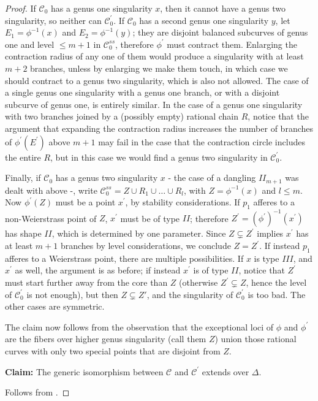 \documentclass[11pt]{amsart}
\newcommand{\dvr}{\Delta}
\theoremstyle{plain}
\theoremstyle{definition}
\begin{document}
\begin{proof}
 If $\mathcal C_0$ has a genus one singularity $x$, then it cannot have a genus two singularity, so neither can $\mathcal C^\prime_0$. If $\mathcal C_0$ has a second genus one singularity $y$, let $E_1=\phi^{-1}(x)$ and $E_2=\phi^{-1}(y)$; they are disjoint balanced subcurves of genus one and level $\leq m+1$ in $\mathcal C^{ss}_0$, therefore $\phi^\prime$ must contract them. Enlarging the contraction radius of any one of them would produce a singularity with at least $m+2$ branches, unless by enlarging we make them touch, in which case we should contract to a genus two singularity, which is also not allowed. The case of a single genus one singularity with a genus one branch, or with a disjoint subcurve of genus one, is entirely similar. In the case of a genus one singularity with two branches joined by a (possibly empty) rational chain $R$, notice that the argument that expanding the contraction radius increases the number of branches of $\phi^\prime(E^\prime)$ above $m+1$ may fail in the case that the contraction circle includes the entire $R$, but in this case we would find a genus two singularity in $\mathcal C^\prime_0$.
 
 Finally, if $\mathcal C_0$ has a genus two singularity $x$ - the case of a dangling $I\!I_{m+1}$ was dealt with above -, write $\mathcal C^{ss}_0=Z\cup R_1\cup\ldots\cup R_l$, with $Z=\phi^{-1}(x)$ and $l\leq m$. Now $\phi^\prime(Z)$ must be a point $x^\prime$, by stability considerations. If $p_1$ afferes to a non-Weierstrass point of $Z$, $x^\prime$ must be of type $I\!I$; therefore $Z^\prime=(\phi^\prime)^{-1}(x^\prime)$ has shape $I\!I$, which is determined by one parameter. Since $Z\subsetneq Z^\prime$ implies $x^\prime$ has at least $m+1$ branches by level considerations, we conclude $Z=Z^\prime$. If instead $p_1$ afferes to a Weierstrass point, there are multiple possibilities. If $x$ is type $I\!I\!I$, and $x^\prime$ as well, the argument is as before; if instead $x^\prime$ is of type $I\!I$, notice that $Z^\prime$ must start further away from the core than $Z$ (otherwise $Z^\prime\subsetneq Z$, hence the level of $\mathcal C^\prime_0$ is not enough), but then $Z\subsetneq Z\prime$, and the singularity of $\mathcal C^\prime_0$ is too bad. The other cases are symmetric.
 
 The claim now follows from the observation that the exceptional loci of $\phi$ and $\phi^\prime$ are the fibers over higher genus singularity (call them $Z$) union those rational curves with only two special points that are disjoint from $Z$.
 
 \textbf{Claim:} The generic isomorphism between $\mathcal C$ and $\mathcal C^\prime$ extends over $\dvr$.
 
 Follows from \cite[Lemma1.13]{Debarre}.
\end{proof}
\end{document}

